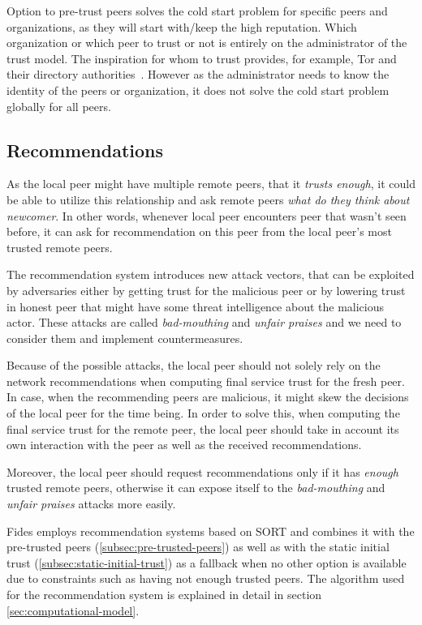 Option to pre-trust peers solves the cold start problem for specific peers and organizations, as they will start with/keep the high reputation.
Which organization or which peer to trust or not is entirely on the administrator of the trust model. The inspiration for whom to trust provides, for example, Tor and their directory authorities~\cite{torauth}.
However as the administrator needs to know the identity of the peers or organization, it does not solve the cold start problem globally for all peers.

\subsection{Recommendations}
\label{subsec:recommendations}
As the local peer might have multiple remote peers, that it \textit{trusts enough}, it could be able to utilize this relationship and ask remote peers \textit{what do they think about newcomer}. 
In other words, whenever local peer encounters peer that wasn't seen before, it can ask for recommendation on this peer from the local peer's most trusted remote peers.

The recommendation system introduces new attack vectors, that can be exploited by adversaries either by getting trust for the malicious peer or by lowering trust in honest peer that might have some threat intelligence about the malicious actor. 
These attacks are called \textit{bad-mouthing} and \textit{unfair praises} and we need to consider them and implement countermeasures.

Because of the possible attacks, the local peer should not solely rely on the network recommendations when computing final service trust for the fresh peer. In case, when the recommending peers are malicious, it might skew the decisions of the local peer for the time being.
In order to solve this, when computing the final service trust for the remote peer, the local peer should take in account its own interaction with the peer as well as the received recommendations.

Moreover, the local peer should request recommendations only if it has \textit{enough} trusted remote peers, otherwise it can expose itself to the \textit{bad-mouthing} and \textit{unfair praises} attacks more easily.

\vspace{7mm}

Fides employs recommendation systems based on SORT \cite{sort} and combines it with the pre-trusted peers (\ref{subsec:pre-trusted-peers}) as well as with the static initial trust (\ref{subsec:static-initial-trust}) as a fallback when no other option is available due to constraints such as having not enough trusted peers.
The algorithm used for the recommendation system is explained in detail in section \ref{sec:computational-model}.